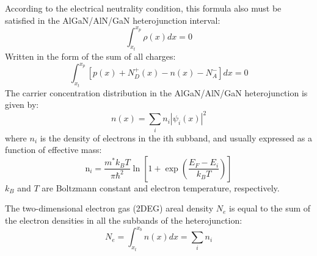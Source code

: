 According to the electrical neutrality  condition, this formula also must be satisfied in the AlGaN/AlN/GaN  heterojunction interval:
\begin{equation}
\int_{x_{t}}^{x_{p}} \rho(x) d x=0
\label{eq:2.23}
\end{equation}
Written in the form of the sum of all charges:
\begin{equation}
\int_{x_{t}}^{x_{p}}\left[p(x)+N_{D}^{+}(x)-n(x)-N_{A}^{-}\right] d x=0
\label{eq:2.24}
\end{equation}
The carrier concentration  distribution  in the AlGaN/AlN/GaN heterojunction is given by:
\begin{equation}
n(x)=\sum_{i} n_{i}\left|\psi_{i}(x)\right|^{2}
\label{eq:2.25}
\end{equation}
where $n_{i}$ is the density of electrons in the ith subband, and usually expressed as a function of effective mass:
\begin{equation}
\mathrm{n}_{i}=\frac{m^{*} k_{B} T}{\pi \hbar^{2}} \ln \left[1+\exp \left(\frac{E_{F}-E_{i}}{k_{B} T}\right)\right]
\label{eq:2.26}
\end{equation}
$k_{B}$ and $T$ are Boltzmann constant and electron temperature, respectively.

The two-dimensional electron gas (2DEG)  areal density $N_{e}$ is equal to the sum of the electron densities in all the subbands of the heterojunction:
\begin{equation}
N_{e}=\int_{x_{t}}^{x_{b}} n(x) d x=\sum_{i} n_{i}
\label{eq:2.27}
\end{equation}

